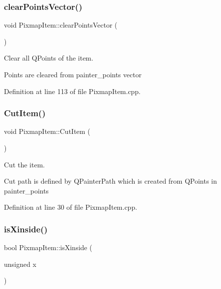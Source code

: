 \subsubsection{\texorpdfstring{clear\+Points\+Vector()}{clearPointsVector()}}
{\footnotesize\ttfamily void Pixmap\+Item\+::clear\+Points\+Vector (\begin{DoxyParamCaption}{ }\end{DoxyParamCaption})}



Clear all Q\+Points of the item. 

Points are cleared from painter\+\_\+points vector 

Definition at line 113 of file Pixmap\+Item.\+cpp.

\mbox{\label{classPixmapItem_a4a742318dce01d018da2f4b01790c210}} 
\subsubsection{\texorpdfstring{Cut\+Item()}{CutItem()}}
{\footnotesize\ttfamily void Pixmap\+Item\+::\+Cut\+Item (\begin{DoxyParamCaption}{ }\end{DoxyParamCaption})}



Cut the item. 

Cut path is defined by Q\+Painter\+Path which is created from Q\+Points in painter\+\_\+points 

Definition at line 30 of file Pixmap\+Item.\+cpp.

\mbox{\label{classPixmapItem_ad5510bf5a97b352e3b06cb888ac0a99c}} 
\subsubsection{\texorpdfstring{is\+Xinside()}{isXinside()}}
{\footnotesize\ttfamily bool Pixmap\+Item\+::is\+Xinside (\begin{DoxyParamCaption}\item[{unsigned}]{x }\end{DoxyParamCaption})}



